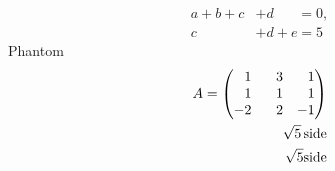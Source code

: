 \documentclass{amsart}
\begin{document}
\begin{align*}
    a + b + c &+ d \phantom{{}+e} = 0,\\
    c &+ d + e = 5
\end{align*}
Phantom
\begin{align*}
    A =
        \renewcommand\!{\phantom-}
        \begin{pmatrix}
            \!1 &\!3 &\!1\\
            \!1 &\!1 &\!1\\
            -2 &\!2 &-1
        \end{pmatrix}\\
    \sqrt5\,\text{side}\\
    \sqrt5 \text{side}
\end{align*}
\end{document}
